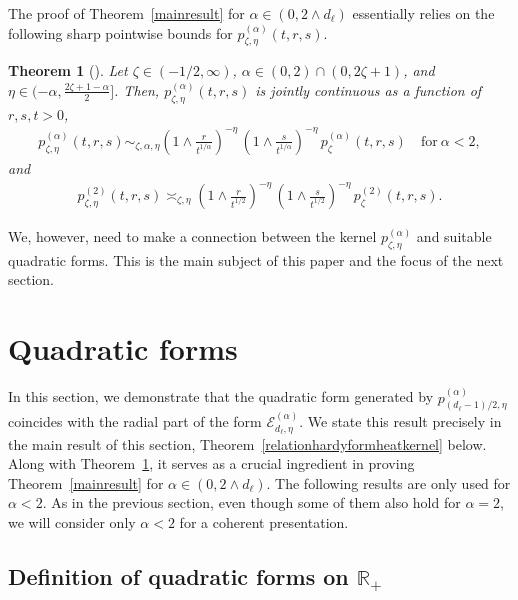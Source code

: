 \documentclass[12pt,reqno]{amsart}
\newtheorem{theorem}{Theorem}[section]
\theoremstyle{definition}
\theoremstyle{remark}
\numberwithin{equation}{section}
\newcommand{\1}{\mathbbm{1}}
\newcommand{\R}{\mathbb{R}}
\def\ce{\mathcal{E}}
\begin{document}
The proof of Theorem~\ref{mainresult} for $\alpha\in(0,2\wedge d_\ell)$ essentially relies on the following sharp pointwise bounds for $p_{\zeta,\eta}^{(\alpha)}(t,r,s)$.

\begin{theorem}[{\cite[Theorem~1.1]{Bogdanetal2024}}]
  \label{mainresultgen}
  Let $\zeta\in(-1/2,\infty)$, $\alpha\in(0,2)\cap(0,2\zeta+1)$, and $\eta\in(-\alpha,\frac{2\zeta+1-\alpha}{2}]$. Then, $p_{\zeta,\eta}^{(\alpha)}(t,r,s)$ is jointly continuous as a function of $r,s,t>0$,
  \begin{align}
    \label{eq:mainresultgenalpha}
      p_{\zeta,\eta}^{(\alpha)}(t,r,s)
      \sim_{\zeta,\alpha,\eta} \left(1\wedge\frac{r}{t^{1/\alpha}}\right)^{-\eta}\, \left(1\wedge\frac{s}{t^{1/\alpha}}\right)^{-\eta}\, p_\zeta^{(\alpha)}(t,r,s) \quad \text{for} \ \alpha<2,
  \end{align}
  and
  \begin{align}
    \label{eq:mainresultgen2}
    p_{\zeta,\eta}^{(2)}(t,r,s)
    \asymp_{\zeta,\eta} \left(1\wedge\frac{r}{t^{1/2}}\right)^{-\eta}\, \left(1\wedge\frac{s}{t^{1/2}}\right)^{-\eta}\, p_\zeta^{(2)}(t,r,s).
  \end{align}
\end{theorem}

We, however, need to make a connection between the kernel $p_{\zeta,\eta}^{(\alpha)}$ and suitable quadratic forms. This is the main subject of this paper and the focus of the next section.


\section{Quadratic forms}
\label{s:quadraticforms}

In this section, we demonstrate that the quadratic form generated by \( p_{(d_\ell - 1)/2, \eta}^{(\alpha)} \) coincides with the radial part of the form \( \ce_{d_\ell, \eta}^{(\alpha)} \). We state this result precisely in the main result of this section, Theorem~\ref{relationhardyformheatkernel} below. Along with Theorem~\ref{mainresultgen}, it serves as a crucial ingredient in proving Theorem~\ref{mainresult} for $\alpha\in(0,2\wedge d_\ell)$.
%
The following results are only used for $\alpha<2$. As in the previous section, even though some of them also hold for $\alpha=2$, we will consider only $\alpha<2$ for a coherent presentation.

\subsection{Definition of quadratic forms on $\R_+$}
\label{s:defquadformsemigroup}
\end{document}
